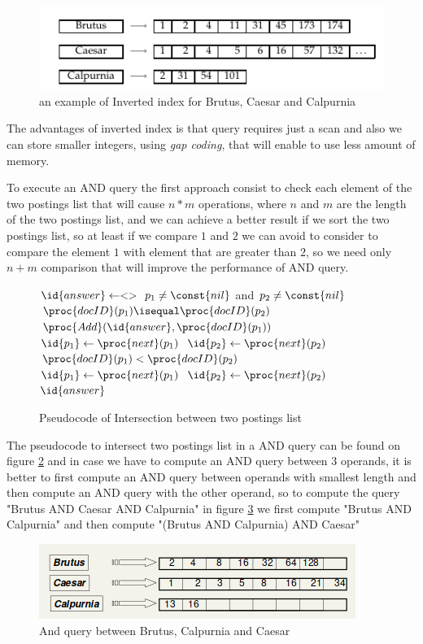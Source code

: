 \begin{figure}
    \caption{an example of Inverted index for Brutus, Caesar and Calpurnia}
    \label{img:invertedIndex}
    \includegraphics[width=\textwidth]{Images/invertedIndex}
\end{figure}
The advantages of inverted index is that query requires just a scan and also we can store smaller integers,
using \emph{gap coding}, that will enable to use less amount of memory.

To execute an AND query the first approach consist to check each element of the two postings list that will cause 
$n * m$ operations, where $n$ and $m$ are the length of the two postings list, and we can achieve a better result
if we sort the two postings list, so at least if we compare $1$ and $2$ we can avoid to consider to compare the
element $1$ with element that are greater than $2$, so we need only $n + m$ comparison that will improve the
performance of AND query.

\begin{figure}
    \caption{Pseudocode of Intersection between two postings list}
    \label{alg:intersection}
    \begin{codebox}
        \li $\id{answer} \gets <> $
        \li \While $p_1 \neq \const{nil}$ and $p_2 \neq \const{nil}$ 
            \Do
        \li     \If $\proc{docID}(p_1) \isequal \proc{docID}(p_2)$
        \li         \Then $\proc{Add}(\id{answer}, \proc{docID}(p_1))$
        \li               $\id{p_1} \gets \proc{next}(p_1)$
        \li               $\id{p_2} \gets \proc{next}(p_2)$
        \li     \ElseIf $\proc{docID}(p_1) < \proc{docID}(p_2)$
        \li         \Then $\id{p_1} \gets \proc{next}(p_1)$
        \li     \ElseNoIf $\id{p_2} \gets \proc{next}(p_2)$
                \End
        \li \Return $\id{answer}$
    \end{codebox}
\end{figure}

The pseudocode to intersect two postings list in a AND query can be found on figure \ref{alg:intersection} and
in case we have to compute an AND query between 3 operands, it is better to first compute an AND query between
operands with smallest length and then compute an AND query with the other operand, so to compute the 
query "Brutus AND Caesar AND Calpurnia" in figure \ref{img:andQuery} we first compute "Brutus AND Calpurnia" and
then compute "(Brutus AND Calpurnia) AND Caesar"

\begin{figure}
    \caption{And query between Brutus, Calpurnia and Caesar}
    \label{img:andQuery}
    \includegraphics[width=\textwidth]{Images/andQuery}
\end{figure}





